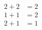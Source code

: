 \documentclass[preview]{standalone}
\begin{document}
\begin{align*}
\begin{aligned}2 + 2 &= 2 \\1 + 1 &= 2 \\2 + 1 &= 1\end{aligned}
\end{align*}
\end{document}
